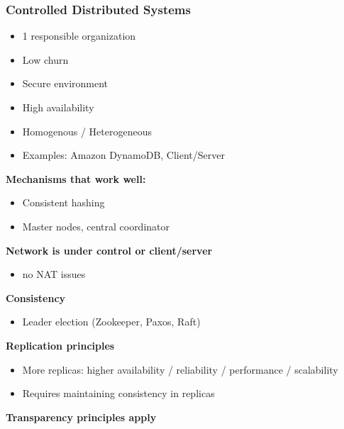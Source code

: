 \subsubsection{Controlled Distributed Systems}
\begin{itemize}
    \item 1 responsible organization
    \item Low churn
    \item Secure environment
    \item High availability
    \item Homogenous / Heterogeneous
    \item Examples: Amazon DynamoDB, Client/Server
\end{itemize}
\textbf{Mechanisms that work well:}
\begin{itemize}
    \item Consistent hashing
    \item Master nodes, central coordinator
\end{itemize}
\textbf{Network is under control or client/server}
\begin{itemize}
    \item no NAT issues
\end{itemize}
\textbf{Consistency}
\begin{itemize}
    \item Leader election (Zookeeper, Paxos, Raft)
\end{itemize}
\textbf{Replication principles}
\begin{itemize}
    \item More replicas: higher availability / reliability / performance / scalability
    \item Requires maintaining consistency in replicas
\end{itemize}
\textbf{Transparency principles apply}

